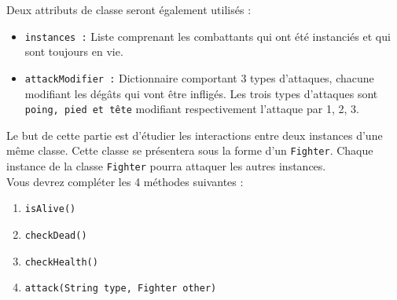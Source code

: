 Deux attributs de classe seront également utilisés :
\begin{itemize}
\item \lstinline{instances :} Liste comprenant les combattants qui ont été instanciés et qui sont toujours en vie.
\item \lstinline{attackModifier :} Dictionnaire comportant 3 types d'attaques, chacune modifiant les dégâts qui vont être infligés. Les trois types d'attaques sont \lstinline{poing, pied et tête} modifiant respectivement l'attaque par 1, 2, 3.\\
\end{itemize}
Le but de cette partie est d'étudier les interactions entre deux instances d'une même classe. Cette classe se présentera sous la forme d'un \lstinline{Fighter}. Chaque instance de la classe \lstinline{Fighter} pourra attaquer les autres instances.
\\
Vous devrez compléter les 4 méthodes suivantes :
\begin{enumerate}
\item \lstinline{isAlive()}
\item \lstinline{checkDead()}
\item \lstinline{checkHealth()}
\item \lstinline{attack(String type, Fighter other)}\\
\end{enumerate}

